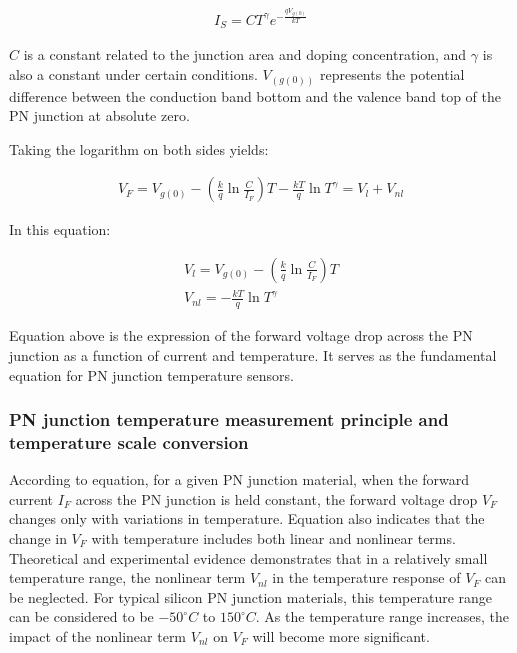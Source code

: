 \documentclass[UTF8]{article}
\begin{document}
   \begin{eqnarray}
   I_{S}=C T^{\gamma} e^{-\frac{q V_{g(0)}}{k T}}
   \end{eqnarray}
   
   $C$ is a constant related to the junction area and doping concentration, and $\gamma$ is also a constant under certain conditions. $V_(g(0))$ represents the potential difference between the conduction band bottom and the valence band top of the PN junction at absolute zero.
   
   Taking the logarithm on both sides yields:
   
   \begin{eqnarray}
   V_{F}=V_{g(0)}-\left(\frac{k}{q} \ln \frac{C}{I_{F}}\right) T-\frac{k T}{q} \ln T^{\gamma}=V_{l}+V_{n l}
   \end{eqnarray}
   
   In this equation:
   
   \begin{eqnarray}
   V_{l}=V_{g(0)}-\left(\frac{k}{q} \ln \frac{C}{I_{F}}\right) T \\
   V_{n l}=-\frac{k T}{q} \ln T^{\gamma}
   \end{eqnarray}
   
   Equation above is the expression of the forward voltage drop across the PN junction as a function of current and temperature. It serves as the fundamental equation for PN junction temperature sensors.
   
   \subsubsection{PN junction temperature measurement principle and temperature scale conversion}
   
   According to equation, for a given PN junction material, when the forward current $I_F$ across the PN junction is held constant, the forward voltage drop $V_F$ changes only with variations in temperature. Equation also indicates that the change in $V_F$ with temperature includes both linear and nonlinear terms. Theoretical and experimental evidence demonstrates that in a relatively small temperature range, the nonlinear term $V_{nl}$ in the temperature response of $V_F$ can be neglected. For typical silicon PN junction materials, this temperature range can be considered to be $-50^{\circ} C$ to $150^{\circ} C$. As the temperature range increases, the impact of the nonlinear term $V_{nl}$ on $V_F$ will become more significant. 
   
\end{document}
